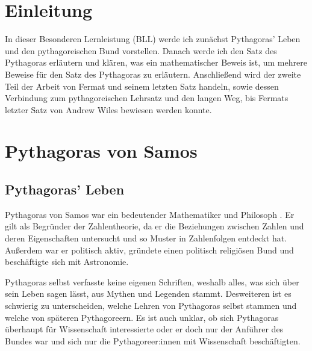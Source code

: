 \documentclass[a4paper,12pt]{article}
\begin{document}

\renewcommand{\figurename}{Abb.}
\def\bdm{\begin{displaymath}}
\def\edm{\end{displaymath}}
\def\bdma{\begin{eqalignno*}}
\def\edma{\end{eqalignno*}}
\def\mkm{\mkern 1mu}
\def\mkmm{\mkern 2mu}
\def\mkmmm{\mkern 3mu}
\renewcommand{\baselinestretch}{1.5}
\small
\normalsize
\makeatletter
\newcommand*{\rom}[1]{\expandafter\@slowromancap\romannumeral #1@}
\makeatother

\section{Einleitung}

In dieser Besonderen Lernleistung (BLL) werde ich zunächst Pythagoras' Leben und den pythagoreischen Bund vorstellen. Danach werde ich den Satz des Pythagoras erläutern und klären, was ein mathematischer Beweis ist, um mehrere Beweise für den Satz des Pythagoras zu erläutern. Anschließend wird der zweite Teil der Arbeit von Fermat und seinem letzten Satz handeln, sowie dessen Verbindung zum pythagoreischen Lehrsatz und den langen Weg, bis Fermats letzter Satz von Andrew Wiles bewiesen werden konnte.

\section{Pythagoras von Samos} \label{einleitung}

\subsection{Pythagoras' Leben}

Pythagoras von Samos war ein bedeutender Mathematiker und Philosoph \cite{PythagorasWiki}. Er gilt als Begründer der Zahlentheorie, da er die Beziehungen zwischen Zahlen und deren Eigenschaften untersucht und so Muster in Zahlenfolgen entdeckt hat. Außerdem war er politisch aktiv, gründete einen politisch religiösen Bund und beschäftigte sich mit Astronomie.

Pythagoras selbst verfasste keine eigenen Schriften, weshalb alles, was sich über sein Leben sagen lässt, aus Mythen und Legenden stammt. Desweiteren ist es schwierig zu unterscheiden, welche Lehren von Pythagoras selbst stammen und welche von späteren Pythagoreern. Es ist auch unklar, ob sich Pythagoras überhaupt für Wissenschaft interessierte oder er doch nur der Anführer des Bundes war und sich nur die Pythagoreer:innen mit Wissenschaft beschäftigten.
\end{document}
